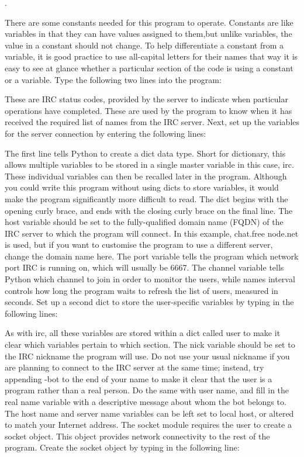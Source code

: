 .

There are some constants needed for this program to operate. Constants are like variables in that they can have values assigned to them,but unlike variables, the value in a constant should not change. To help differentiate a constant from a variable, it is good practice to use all-capital letters for their names that way it is easy to see at glance whether a particular section of the code is using a constant or a variable. Type the following two lines into the program:


These are IRC status codes, provided by the server to indicate when particular operations have completed. These are used by the program to know when it has received the required list of names from the IRC server. Next, set up the variables for the server connection by entering the 
following lines:


The first line tells Python to create a dict data type. Short for dictionary, this allows multiple variables to be stored in a single master variable in this case, irc. These individual variables can then be recalled later in the program. Although you could write this program without using dicts to store variables, it would make the program significantly more difficult to read. The dict begins with the opening curly brace, and ends with the closing curly brace on the final line. The host variable should be set to the fully-qualified domain name (FQDN) of the IRC server to which the program will connect. In this example, chat.free node.net is used, but if you want to customise the program to use a different server, change the domain name here. The port variable tells the program which network port IRC is running  on, which will usually be 6667. The channel variable tells Python which channel to join in order to monitor the users, while names interval controls how long the program waits to refresh the list of users, measured in seconds. Set up a second dict to store the user-specific variables by typing in the following lines:


As with irc, all these variables are stored within a dict called user to make it clear which variables pertain to which section. The nick variable should be set to the IRC nickname the program will use. Do not use your usual nickname if you are planning to connect to the IRC server at the same time; instead, try appending -bot to the end of your name to make it clear that the user is a program rather than a real person. Do the same with user name, and fill in the real name variable with a descriptive message about whom the bot belongs to. The host name and server name variables can be left set to local host, or altered to match your Internet address.
The socket module requires the user to create a socket object. This object provides network connectivity to the rest of the program. Create the socket object by typing in the following line:

